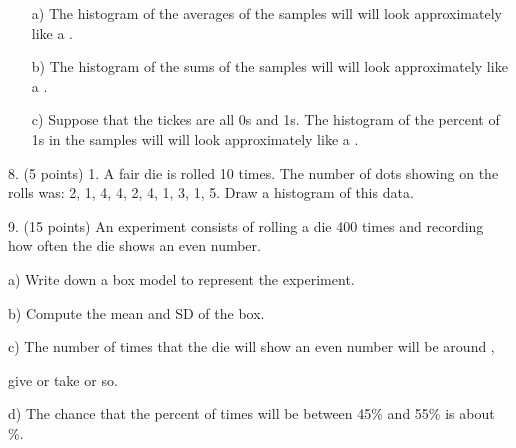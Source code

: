 \documentclass[10pt]{article}
\begin{document}
\begin{itemize}
\item[a)] The histogram of the averages of the samples will
  will look approximately like a \underbar{\hspace{1.2in}}.\vspace{.4in}
\item[b)] The histogram of the sums of the  samples will
  will look approximately like a \underbar{\hspace{1.2in}}.\vspace{.4in}
  
\item[c)] Suppose that the tickes are all 0s and 1s.  The histogram of the
  percent of 1s in the  samples will
  will look approximately like a \underbar{\hspace{1.2in}}.
\end{itemize}
\vspace{1in}

8. (5 points) 1. A fair die is rolled 10 times.  The number of dots showing on the rolls
was:  2, 1, 4, 4, 2, 4, 1, 3, 1, 5. 
Draw a histogram of this data.
\vspace{1.5in}

9.  (15 points) An experiment consists of rolling a die 400 times and recording how often
the die shows an even number.

\hspace{10pt} a) Write down a box model to represent the experiment.
\vspace{.5in}

\hspace{10pt} b) Compute the mean and SD of the box.
\vspace{1in}

\hspace{10pt} c) The number of times that the die will show an even number 
will be around \underline{\hspace{1in}},\vspace{10pt}

\hspace{10pt}\hphantom{e) }give or take \underline{\hspace{1in}} or so.  %
\vspace{.8in}

\hspace{10pt} d) The chance that the percent of times will be between 45\% and 55\% is about
\underline{\hspace{1in}} \%.  
\vfill
\eject
\end{document}
